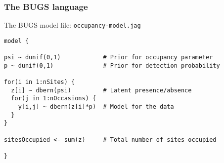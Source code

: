 \documentclass[color=usenames,dvipsnames]{beamer}\usepackage[]{graphicx}\usepackage[]{xcolor}
\makeatletter
\newenvironment{kframe}{%
 \def\at@end@of@kframe{}%
 \ifinner\ifhmode%
  \def\at@end@of@kframe{\end{minipage}}%
  \begin{minipage}{\columnwidth}%
 \fi\fi%
 \def\FrameCommand##1{\hskip\@totalleftmargin \hskip-\fboxsep
 \colorbox{shadecolor}{##1}\hskip-\fboxsep
     \hskip-\linewidth \hskip-\@totalleftmargin \hskip\columnwidth}%
 \MakeFramed {\advance\hsize-\width
   \@totalleftmargin\z@ \linewidth\hsize
   \@setminipage}}%
 {\par\unskip\endMakeFramed%
 \at@end@of@kframe}
\newenvironment{knitrout}{}{} %
\makeatother
\begin{document}
\begin{frame}[fragile]
  \frametitle{The BUGS language}
  The BUGS model file: {\tt occupancy-model.jag}
\begin{knitrout}\scriptsize
{}\color{fgcolor}\begin{kframe}
\begin{verbatim}
model {

psi ~ dunif(0,1)            # Prior for occupancy parameter
p ~ dunif(0,1)              # Prior for detection probability

for(i in 1:nSites) {
  z[i] ~ dbern(psi)         # Latent presence/absence
  for(j in 1:nOccasions) {
    y[i,j] ~ dbern(z[i]*p)  # Model for the data
  }
}

sitesOccupied <- sum(z)     # Total number of sites occupied

}
\end{verbatim}
\end{kframe}
\end{knitrout}
\end{frame}
\end{document}
